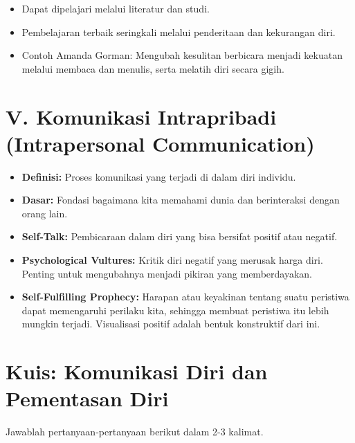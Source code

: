 \documentclass[
  letterpaper,
  DIV=11,
  numbers=noendperiod]{scrreprt}
\providecommand{\tightlist}{%
  \setlength{\itemsep}{0pt}\setlength{\parskip}{0pt}}
\begin{document}
\begin{itemize}
\tightlist
\item
  Dapat dipelajari melalui literatur dan studi.
\item
  Pembelajaran terbaik seringkali melalui penderitaan dan kekurangan
  diri.
\item
  Contoh Amanda Gorman: Mengubah kesulitan berbicara menjadi kekuatan
  melalui membaca dan menulis, serta melatih diri secara gigih.
\end{itemize}

\section{V. Komunikasi Intrapribadi (Intrapersonal
Communication)}\label{v.-komunikasi-intrapribadi-intrapersonal-communication}

\begin{itemize}
\tightlist
\item
  \textbf{Definisi:} Proses komunikasi yang terjadi di dalam diri
  individu.
\item
  \textbf{Dasar:} Fondasi bagaimana kita memahami dunia dan berinteraksi
  dengan orang lain.
\item
  \textbf{Self-Talk:} Pembicaraan dalam diri yang bisa bersifat positif
  atau negatif.
\item
  \textbf{Psychological Vultures:} Kritik diri negatif yang merusak
  harga diri. Penting untuk mengubahnya menjadi pikiran yang
  memberdayakan.
\item
  \textbf{Self-Fulfilling Prophecy:} Harapan atau keyakinan tentang
  suatu peristiwa dapat memengaruhi perilaku kita, sehingga membuat
  peristiwa itu lebih mungkin terjadi. Visualisasi positif adalah bentuk
  konstruktif dari ini.
\end{itemize}

\section{Kuis: Komunikasi Diri dan Pementasan
Diri}\label{kuis-komunikasi-diri-dan-pementasan-diri}

Jawablah pertanyaan-pertanyaan berikut dalam 2-3 kalimat.
\end{document}
